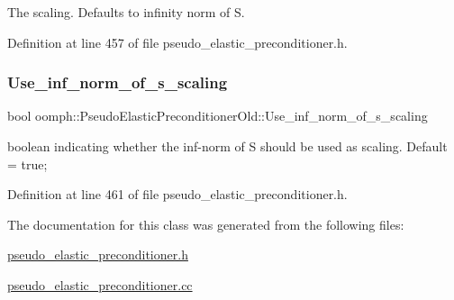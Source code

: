 The scaling. Defaults to infinity norm of S. 



Definition at line 457 of file pseudo\+\_\+elastic\+\_\+preconditioner.\+h.

\mbox{\label{classoomph_1_1PseudoElasticPreconditionerOld_a475f2a2576128e4a17ee494343438ba5}} 
\subsubsection{\texorpdfstring{Use\+\_\+inf\+\_\+norm\+\_\+of\+\_\+s\+\_\+scaling}{Use\_inf\_norm\_of\_s\_scaling}}
{\footnotesize\ttfamily bool oomph\+::\+Pseudo\+Elastic\+Preconditioner\+Old\+::\+Use\+\_\+inf\+\_\+norm\+\_\+of\+\_\+s\+\_\+scaling\hspace{0.3cm}{\ttfamily [private]}}



boolean indicating whether the inf-\/norm of S should be used as scaling. Default = true; 



Definition at line 461 of file pseudo\+\_\+elastic\+\_\+preconditioner.\+h.



The documentation for this class was generated from the following files\+:\begin{DoxyCompactItemize}
\item 
\hyperlink{pseudo__elastic__preconditioner_8h}{pseudo\+\_\+elastic\+\_\+preconditioner.\+h}\item 
\hyperlink{pseudo__elastic__preconditioner_8cc}{pseudo\+\_\+elastic\+\_\+preconditioner.\+cc}\end{DoxyCompactItemize}
